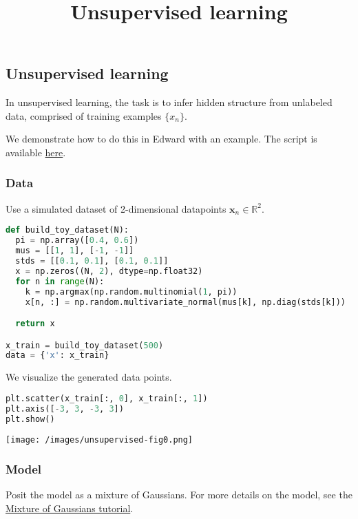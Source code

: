 \title{Unsupervised learning}

\subsection{Unsupervised learning}

In unsupervised learning, the task is to infer hidden structure from
unlabeled data, comprised of training examples $\{x_n\}$.

We demonstrate how to do this in Edward with an example.
The script is available
\href{https://github.com/blei-lab/edward/blob/master/examples/tf_mixture_gaussian.py}
{here}.


\subsubsection{Data}

Use a simulated dataset of 2-dimensional datapoints
$\mathbf{x}_n\in\mathbb{R}^2$.
\begin{lstlisting}[language=Python]
def build_toy_dataset(N):
  pi = np.array([0.4, 0.6])
  mus = [[1, 1], [-1, -1]]
  stds = [[0.1, 0.1], [0.1, 0.1]]
  x = np.zeros((N, 2), dtype=np.float32)
  for n in range(N):
    k = np.argmax(np.random.multinomial(1, pi))
    x[n, :] = np.random.multivariate_normal(mus[k], np.diag(stds[k]))

  return x

x_train = build_toy_dataset(500)
data = {'x': x_train}
\end{lstlisting}

We visualize the generated data points.
\begin{lstlisting}[language=Python]
plt.scatter(x_train[:, 0], x_train[:, 1])
plt.axis([-3, 3, -3, 3])
plt.show()
\end{lstlisting}
\texttt{[image: /images/unsupervised-fig0.png]}

\subsubsection{Model}

Posit the model as a mixture of Gaussians. For more details on the
model, see the
\href{/tutorials/mixture-gaussian}
{Mixture of Gaussians tutorial}.

